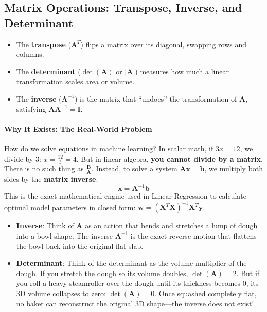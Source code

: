 \subsection{Matrix Operations: Transpose, Inverse, and Determinant}

\begin{keyidea}
\begin{itemize}
    \item The \textbf{transpose} ($\mathbf{A}^T$) flips a matrix over its diagonal, swapping rows and columns.
    \item The \textbf{determinant} ($\det(\mathbf{A})$ or $|\mathbf{A}|$) measures how much a linear transformation scales area or volume.
    \item The \textbf{inverse} ($\mathbf{A}^{-1}$) is the matrix that ``undoes'' the transformation of $\mathbf{A}$, satisfying $\mathbf{A}\mathbf{A}^{-1} = \mathbf{I}$.
\end{itemize}
\end{keyidea}

\paragraph{Why It Exists: The Real-World Problem}
How do we solve equations in machine learning? In scalar math, if $3x = 12$, we divide by 3: $x = \frac{12}{3} = 4$. But in linear algebra, \textbf{you cannot divide by a matrix}. There is no such thing as $\frac{\mathbf{B}}{\mathbf{A}}$. Instead, to solve a system $\mathbf{A}\mathbf{x} = \mathbf{b}$, we multiply both sides by the \textbf{matrix inverse}:
\begin{equation}
\mathbf{x} = \mathbf{A}^{-1}\mathbf{b}
\end{equation}
This is the exact mathematical engine used in Linear Regression to calculate optimal model parameters in closed form: $\mathbf{w} = (\mathbf{X}^T \mathbf{X})^{-1} \mathbf{X}^T \mathbf{y}$.

\begin{analogy}
\begin{itemize}
    \item \textbf{Inverse}: Think of $\mathbf{A}$ as an action that bends and stretches a lump of dough into a bowl shape. The inverse $\mathbf{A}^{-1}$ is the exact reverse motion that flattens the bowl back into the original flat slab.
    \item \textbf{Determinant}: Think of the determinant as the volume multiplier of the dough. If you stretch the dough so its volume doubles, $\det(\mathbf{A}) = 2$. But if you roll a heavy steamroller over the dough until its thickness becomes $0$, its 3D volume collapses to zero: $\det(\mathbf{A}) = 0$. Once squashed completely flat, no baker can reconstruct the original 3D shape—the inverse does not exist!
\end{itemize}
\end{analogy}


